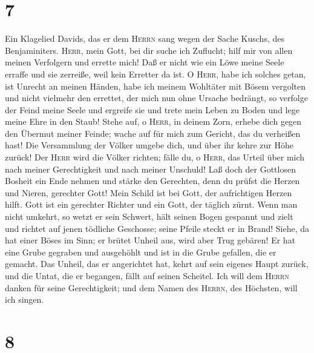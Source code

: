 \hypertarget{section-6}{%
\section{7}\label{section-6}}

 Ein Klagelied Davids, das er dem \textsc{Herrn} sang
wegen der Sache Kuschs, des Benjaminiters. \textsc{Herr}, mein Gott, bei
dir suche ich Zuflucht; hilf mir von allen meinen Verfolgern und errette
mich!  Daß er nicht wie ein Löwe meine Seele erraffe und
sie zerreiße, weil kein Erretter da ist.  O \textsc{Herr},
habe ich solches getan, ist Unrecht an meinen Händen, 
habe ich meinem Wohltäter mit Bösem vergolten und nicht vielmehr den
errettet, der mich nun ohne Ursache bedrängt,  so verfolge
der Feind meine Seele und ergreife sie und trete mein Leben zu Boden und
lege meine Ehre in den Staub!  Stehe auf, o \textsc{Herr},
in deinem Zorn, erhebe dich gegen den Übermut meiner Feinde; wache auf
für mich zum Gericht, das du verheißen hast!  Die
Versammlung der Völker umgebe dich, und über ihr kehre zur Höhe zurück!
 Der \textsc{Herr} wird die Völker richten; fälle du, o
\textsc{Herr}, das Urteil über mich nach meiner Gerechtigkeit und nach
meiner Unschuld!  Laß doch der Gottlosen Bosheit ein Ende
nehmen und stärke den Gerechten, denn du prüfst die Herzen und Nieren,
gerechter Gott!  Mein Schild ist bei Gott, der
aufrichtigen Herzen hilft.  Gott ist ein gerechter
Richter und ein Gott, der täglich zürnt.  Wenn man nicht
umkehrt, so wetzt er sein Schwert, hält seinen Bogen gespannt und zielt
 und richtet auf jenen tödliche Geschosse; seine Pfeile
steckt er in Brand!  Siehe, da hat einer Böses im Sinn;
er brütet Unheil aus, wird aber Trug gebären!  Er hat
eine Grube gegraben und ausgehöhlt und ist in die Grube gefallen, die er
gemacht.  Das Unheil, das er angerichtet hat, kehrt auf
sein eigenes Haupt zurück, und die Untat, die er begangen, fällt auf
seinen Scheitel.  Ich will dem \textsc{Herrn} danken für
seine Gerechtigkeit; und dem Namen des \textsc{Herrn}, des Höchsten,
will ich singen.

\hypertarget{section-7}{%
\section{8}\label{section-7}}

